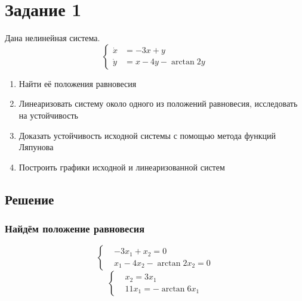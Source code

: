 


    
    \setcounter{page}{2}
    \setlength{\parindent}{0pt}

    \section*{Задание 1}
    Дана нелинейная система.
    \begin{equation*}
        \left\{
        \begin{aligned}
            \dot{x} &= -3x + y\\
            \dot{y} &= x - 4y - \arctan{2y}
        \end{aligned}
        \right.
    \end{equation*}

    \begin{enumerate}
        \item Найти её положения равновесия
        \item Линеаризовать систему около одного из положений равновесия, исследовать на устойчивость
        \item Доказать устойчивость исходной системы с помощью метода функций Ляпунова
        \item Построить графики исходной и линеаризованной систем
    \end{enumerate}

    \subsection*{Решение}
    \subsubsection*{Найдём положение равновесия}
    \begin{equation*}
        \left\{
        \begin{aligned}
            &-3x_1 + x_2 = 0 \\
            &x_1 - 4x_2 - \arctan{2x_2} = 0
        \end{aligned}
        \right.
    \end{equation*}
    \begin{equation*}
        \left\{
        \begin{aligned}
            &x_2 = 3x_1 \\
            &11x_1 = -\arctan{6x_1}
        \end{aligned}
        \right.
    \end{equation*}

